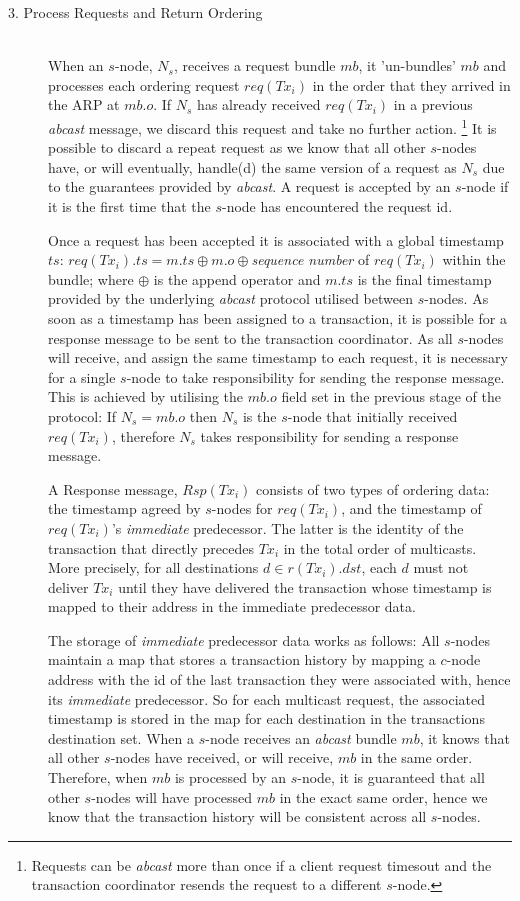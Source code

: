 \begin{description}
		\item[3. Process Requests and Return Ordering] \hfill \\
		When an $s$-node, $N_s$, receives a request bundle $mb$, it 'un-bundles' $mb$ and processes each ordering request $req(Tx_i)$ in the order that they arrived in the ARP at $mb.o$.  If $N_s$ has already received $req(Tx_i)$ in a previous \emph{abcast} message, we discard this request and take no further action.  \footnote{Requests can be \emph{abcast} more than once if a client request timesout and the transaction coordinator resends the request to a different $s$-node.} It is possible to discard a repeat request as we know that all other $s$-nodes have, or will eventually, handle(d) the same version of a request as $N_s$ due to the guarantees provided by \emph{abcast}.  A request is accepted by an $s$-node if it is the first time that the $s$-node has encountered the request id.  
		
		Once a request has been accepted it is associated with a global timestamp $ts$: $req(Tx_i).ts = m.ts\oplus m.o \oplus$\emph{sequence number} of $req(Tx_i)$ within the bundle; where $\oplus$ is the append operator and $m.ts$ is the final timestamp provided by the underlying \emph{abcast} protocol utilised between $s$-nodes.  As soon as a timestamp has been assigned to a transaction, it is possible for a response message to be sent to the transaction coordinator.  As all $s$-nodes will receive, and assign the same timestamp to each request, it is necessary for a single $s$-node to take responsibility for sending the response message.  This is achieved by utilising the $mb.o$ field set in the previous stage of the protocol: If $N_s = mb.o$ then $N_s$ is the $s$-node that initially received $req(Tx_i)$, therefore $N_s$ takes responsibility for sending a response message.  
				
		A Response message, $Rsp(Tx_i)$ consists of two types of ordering data: the timestamp agreed by $s$-nodes for $req(Tx_i)$, and the timestamp of $req(Tx_i)$'s \emph{immediate} predecessor.  The latter is the identity of the transaction that directly precedes $Tx_i$ in the total order of multicasts.  More precisely, for all destinations $d \in r(Tx_i).dst$, each $d$ must not deliver $Tx_i$ until they have delivered the transaction whose timestamp is mapped to their address in the immediate predecessor data.  
				
		The storage of \emph{immediate} predecessor data works as follows: All $s$-nodes maintain a map that stores a transaction history by mapping a $c$-node address with the id of the last transaction they were associated with, hence its \emph{immediate} predecessor.  So for each multicast request, the associated timestamp is stored in the map for each destination in the transactions destination set. When a $s$-node receives an \emph{abcast} bundle $mb$, it knows that all other $s$-nodes have received, or will receive, $mb$ in the same order.  Therefore, when $mb$ is processed by an $s$-node, it is guaranteed that all other $s$-nodes will have processed $mb$ in the exact same order, hence we know that the transaction history will be consistent across all $s$-nodes.  
		

\end{description}
